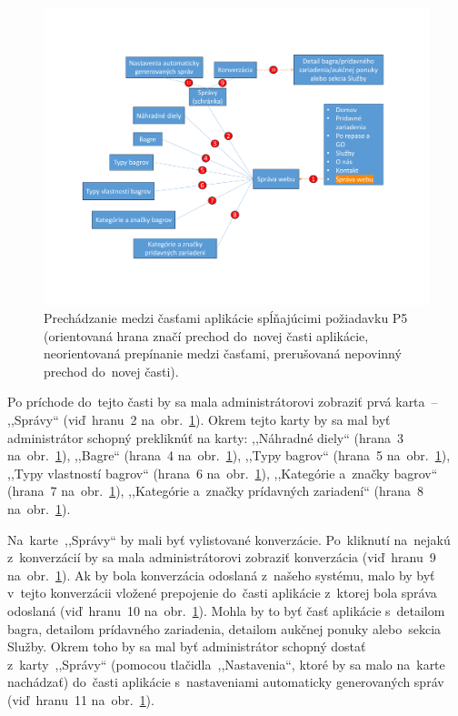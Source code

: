 \begin{figure}[H]\centering
\includegraphics[width=140mm]{../img/UI concept/p5 p7 a sprava predmetov graph}
\caption{Prechádzanie medzi časťami aplikácie spĺňajúcimi požiadavku P5 (orientovaná hrana značí prechod do~novej časti aplikácie, neorientovaná prepínanie medzi časťami, prerušovaná nepovinný prechod do~novej časti).}
\label{p5 p7 a sprava predmetov graph}
\end{figure}

Po príchode do~tejto časti by sa mala administrátorovi zobraziť prvá karta~-- ,,Správy`` (viď~hranu~2 na~obr.~\ref{p5 p7 a sprava predmetov graph}). Okrem tejto karty by sa mal byť administrátor schopný prekliknúť na karty: ,,Náhradné diely`` (hrana~3 na~obr.~\ref{p5 p7 a sprava predmetov graph}), ,,Bagre`` (hrana~4 na~obr.~\ref{p5 p7 a sprava predmetov graph}), ,,Typy bagrov`` (hrana~5 na~obr.~\ref{p5 p7 a sprava predmetov graph}), ,,Typy vlastností bagrov`` (hrana~6 na~obr.~\ref{p5 p7 a sprava predmetov graph}), ,,Kategórie a~značky bagrov`` (hrana~7 na~obr.~\ref{p5 p7 a sprava predmetov graph}), ,,Kategórie a~značky prídavných zariadení`` (hrana~8 na~obr.~\ref{p5 p7 a sprava predmetov graph}).

Na~karte~,,Správy`` by mali byť vylistované konverzácie. Po~kliknutí na~nejakú z~konverzácií by sa mala administrátorovi zobraziť konverzácia (viď~hranu~9 na~obr.~\ref{p5 p7 a sprava predmetov graph}). Ak by bola konverzácia odoslaná z~našeho systému, malo by byť v~tejto konverzácii vložené prepojenie do~časti aplikácie z~ktorej bola správa odoslaná (viď~hranu~10 na~obr.~\ref{p5 p7 a sprava predmetov graph}). Mohla by to byť časť aplikácie s~detailom bagra, detailom prídavného zariadenia, detailom aukčnej ponuky alebo~sekcia Služby. Okrem toho by sa mal byť administrátor schopný dostať z~karty~,,Správy`` (pomocou tlačidla~,,Nastavenia``, ktoré by sa malo na~karte nachádzať) do~časti aplikácie s~nastaveniami automaticky generovaných správ (viď~hranu~11 na~obr.~\ref{p5 p7 a sprava predmetov graph}).


